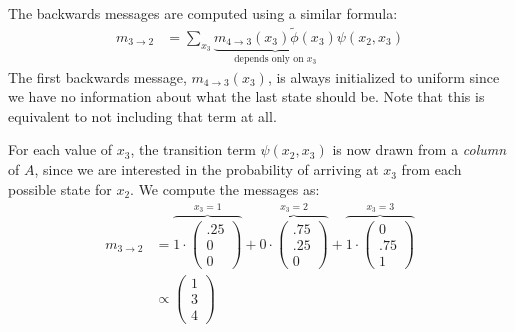 \documentclass[12pt]{article}
\begin{document}
{\begin{enumerate}[(a)]
            The backwards messages are computed using a similar formula:
            \begin{align*}
                m_{3 \to 2} &= \sum_{x_3} \underbrace{m_{4 \to 3}(x_3) \tilde{\phi}(x_3)}_{\text{depends only on $x_3$}} \psi(x_2,x_3)
            \end{align*}
            The first backwards message, $m_{4 \to 3}(x_3)$, is always initialized to uniform
            since we have no information about what the last state should be. Note that this is equivalent
            to not including that term at all.

            For each value of $x_3$, the transition term $\psi(x_2,x_3)$ is now drawn from a \emph{column}
            of $A$, since we are interested in the probability of arriving at $x_3$ from each possible
            state for $x_2$. We compute the messages as:
            \begin{align*}
                m_{3 \to 2} &= 
                    \overbrace{1 \cdot \begin{pmatrix} .25 \\ 0 \\ 0 \end{pmatrix}}^{x_3 = 1} +
                    \overbrace{0 \cdot \begin{pmatrix} .75 \\ .25 \\ 0 \end{pmatrix}}^{x_3 = 2} +
                    \overbrace{1 \cdot \begin{pmatrix} 0 \\ .75 \\ 1 \end{pmatrix}}^{x_3 = 3} \\
                &\propto \begin{pmatrix} 1 \\ 3 \\ 4 \end{pmatrix}
            \end{align*}


\end{enumerate}}
\end{document}
